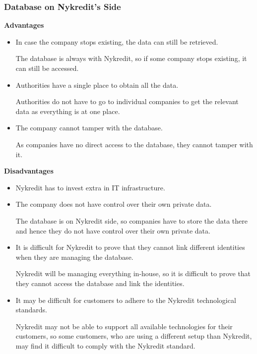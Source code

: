 \subsubsection{Database on Nykredit's Side}
\textbf{Advantages}
\begin{itemize}
	\item In case the company stops existing, the data can still be retrieved.
	
	The database is always with Nykredit, so if some company stops existing, it can still be accessed.
	\item Authorities have a single place to obtain all the data.
	
	Authorities do not have to go to individual companies to get the relevant data as everything is at one place.
	\item The company cannot tamper with the database.
	
	As companies have no direct access to the database, they cannot tamper with it.
\end{itemize}
\textbf{Disadvantages}
\begin{itemize}
	\item Nykredit has to invest extra in IT infrastructure.
	
	\item The company does not have control over their own private data.
	
	The database is on Nykredit side, so companies have to store the data there and hence they do not have control over their own private data.
	\item It is difficult for Nykredit to prove that they cannot link different identities when they are managing the database.
	
	Nykredit will be managing everything in-house, so it is difficult to prove that they cannot access the database and link the identities.
	\item It may be difficult for customers to adhere to the Nykredit technological standards.
	
	Nykredit may not be able to support all available technologies for their customers, so some customers, who are using a different setup than Nykredit, may find it difficult to comply with the Nykredit standard.
\end{itemize}
